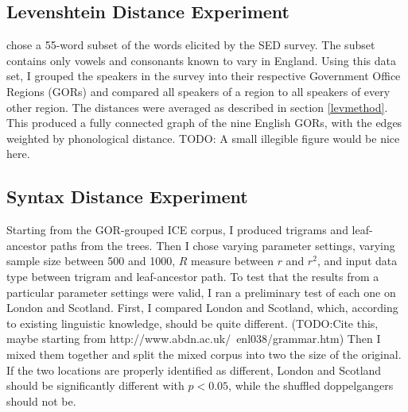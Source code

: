 \documentclass[11pt]{article}
\begin{document}

\subsection{Levenshtein Distance Experiment}

 chose a 55-word subset of the words elicited
by the SED survey. The subset contains only vowels and consonants
known to vary in England. Using this data set, I grouped the speakers
in the survey into their respective Government Office Regions (GORs)
and compared all speakers of a region to all speakers of every other
region. The distances were averaged as described in section
\ref{levmethod}. This produced a fully connected graph of the nine
English GORs, with the edges weighted by phonological
distance. TODO: A small illegible figure would be nice here.

\subsection{Syntax Distance Experiment}

Starting from the GOR-grouped ICE corpus, I produced trigrams and
leaf-ancestor paths from the trees. Then I chose varying parameter
settings, varying sample size between 500 and 1000, $R$ measure
between $r$ and $r^2$, and input data type between trigram and
leaf-ancestor path. To test that the results from a particular
parameter settings were valid, I ran a preliminary test of each one on London and
Scotland. First, I compared London and Scotland, which, according to
existing linguistic knowledge, should be quite different.
(TODO:Cite this, maybe starting from http://www.abdn.ac.uk/~enl038/grammar.htm)
Then I mixed them
together and split the mixed corpus into two the size of the
original. If the two locations are properly identified as different,
London and Scotland should be significantly different with $p < 0.05$, while the
shuffled doppelgangers should not be.
\end{document}
